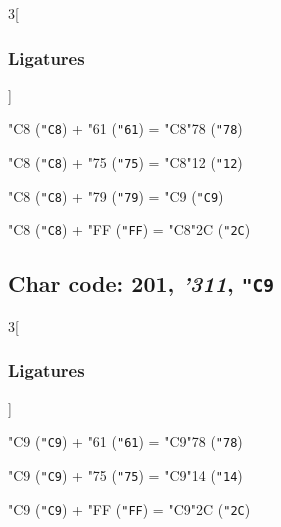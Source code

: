 \documentclass{article}
\newlength{\maxcharwidth}
\begin{document}
\begin{multicols}{3}[\subsubsection{Ligatures}]

{\testfont\char"C8\noboundary} ({\tt"C8}) + {\testfont\char"61\noboundary} ({\tt"61}) = {\testfont\char"C8\noboundary}{\testfont\char"78\noboundary} ({\tt"78}) 

{\testfont\char"C8\noboundary} ({\tt"C8}) + {\testfont\char"75\noboundary} ({\tt"75}) = {\testfont\char"C8\noboundary}{\testfont\char"12\noboundary} ({\tt"12}) 

{\testfont\char"C8\noboundary} ({\tt"C8}) + {\testfont\char"79\noboundary} ({\tt"79}) = {\testfont\char"C9\noboundary} ({\tt"C9}) 

{\testfont\char"C8\noboundary} ({\tt"C8}) + {\testfont\char"FF\noboundary} ({\tt"FF}) = {\testfont\char"C8\noboundary}{\testfont\char"2C\noboundary} ({\tt"2C}) 

\end{multicols}

\subsection{Char code: 201, {\it'311}, {\tt"C9}}
\label{char_201}


\begin{multicols}{3}[\subsubsection{Ligatures}]

{\testfont\char"C9\noboundary} ({\tt"C9}) + {\testfont\char"61\noboundary} ({\tt"61}) = {\testfont\char"C9\noboundary}{\testfont\char"78\noboundary} ({\tt"78}) 

{\testfont\char"C9\noboundary} ({\tt"C9}) + {\testfont\char"75\noboundary} ({\tt"75}) = {\testfont\char"C9\noboundary}{\testfont\char"14\noboundary} ({\tt"14}) 

{\testfont\char"C9\noboundary} ({\tt"C9}) + {\testfont\char"FF\noboundary} ({\tt"FF}) = {\testfont\char"C9\noboundary}{\testfont\char"2C\noboundary} ({\tt"2C}) 

\end{multicols}
\end{document}
